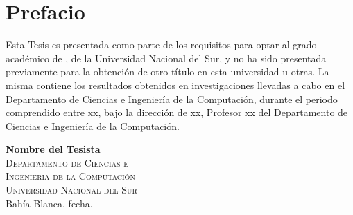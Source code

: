 


\thispagestyle{empty}
\chapter*{Prefacio}

Esta Tesis es presentada como parte de los requisitos para optar
al grado académico de \emph{}, de la Universidad Nacional del Sur, 
y no ha sido presentada previamente para la obtención de otro título en
esta universidad u otras. La misma contiene los resultados
obtenidos en investigaciones llevadas a cabo en el Departamento de
Ciencias e Ingeniería de la Computación, durante el
periodo comprendido entre xx, bajo la dirección de xx, Profesor
xx del Departamento de Ciencias e Ingeniería de la
Computación.


\vspace*{5cm}

{\flushright
\textbf{Nombre del Tesista}\\
\textsc{Departamento de Ciencias e}\\
\textsc{Ingeniería de la Computación}\\
\textsc{Universidad Nacional del Sur}\\
Bahía Blanca, fecha.\\}
